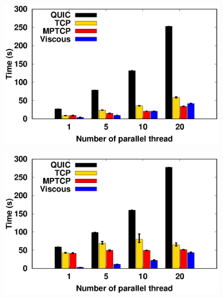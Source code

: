 \begin{figure}[!t]
    \begin{center}
        \begin{minipage}{0.45\linewidth}
            \centering
            \includegraphics[width=\linewidth]{img/exp10/time_elapsed_1}
            \label{fig:exp10_time_16}
        \end{minipage}
        \begin{minipage}{0.45\linewidth}
            \centering
            \includegraphics[width=\linewidth]{img/exp10/time_elapsed_5}
            \label{fig:exp10_time_80}
        \end{minipage}
        \begin{minipage}{0.45\linewidth}
            \centering

\end{minipage}
\end{center}
\end{figure}
